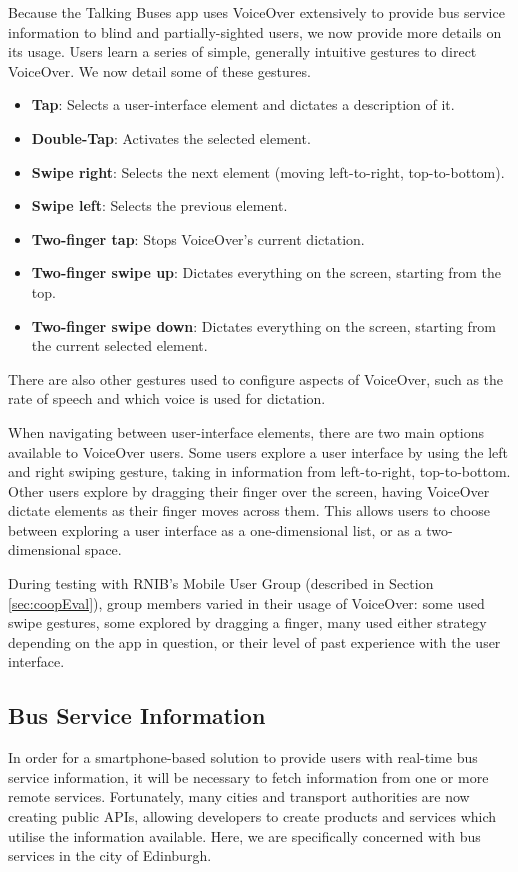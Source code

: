 \documentclass[10pt,twocolumn]{article}
\newcommand{\citep}[1]{}
\begin{document}
Because the Talking Buses app uses VoiceOver extensively to provide bus service information to blind and partially-sighted users, we now provide more details on its usage. Users learn a series of simple, generally intuitive gestures to direct VoiceOver\citep{voGestures}. We now detail some of these gestures.
\begin{itemize}
\item \textbf{Tap}: Selects a user-interface element and dictates a description of it.
\item \textbf{Double-Tap}: Activates the selected element.
\item \textbf{Swipe right}: Selects the next element (moving left-to-right, top-to-bottom).
\item \textbf{Swipe left}: Selects the previous element.
\item \textbf{Two-finger tap}: Stops VoiceOver's current dictation.
\item \textbf{Two-finger swipe up}: Dictates everything on the screen, starting from the top.
\item \textbf{Two-finger swipe down}: Dictates everything on the screen, starting from the current selected element.
\end{itemize}
There are also other gestures used to configure aspects of VoiceOver, such as the rate of speech and which voice is used for dictation.

When navigating between user-interface elements, there are two main options available to VoiceOver users. Some users explore a user interface by using the left and right swiping gesture, taking in information from left-to-right, top-to-bottom. Other users explore by dragging their finger over the screen, having VoiceOver dictate elements as their finger moves across them. This allows users to choose between exploring a user interface as a one-dimensional list, or as a two-dimensional space.

During testing with RNIB's Mobile User Group (described in Section \ref{sec:coopEval}), group members varied in their usage of VoiceOver: some used swipe gestures, some explored by dragging a finger, many used either strategy depending on the app in question, or their level of past experience with the user interface.

\subsection{Bus Service Information}
In order for a smartphone-based solution to provide users with real-time bus service information, it will be necessary to fetch information from one or more remote services. Fortunately, many cities and transport authorities are now creating public APIs, allowing developers to create products and services which utilise the information available. Here, we are specifically concerned with bus services in the city of Edinburgh.
\end{document}
